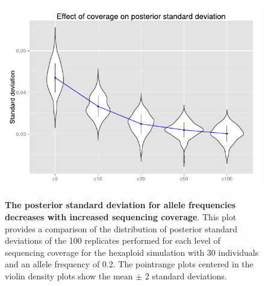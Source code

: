 \documentclass[11pt,english,letterpaper,oneside]{article}
\begin{document}
\begin{figure}
\centering
\caption{\textbf{The posterior standard deviation for allele frequencies decreases with increased sequencing coverage}. This plot provides a comparison of the distribution of posterior standard deviations of the 100 replicates performed for each level of sequencing coverage for the hexaploid simulation with 30 individuals and an allele frequency of 0.2. The pointrange plots centered in the violin density plots show the mean $\pm$ 2 standard deviations.}
\vspace{0.25in}
\includegraphics{fig/figure4-coverage-sd}
\label{fig:coverage-sd}
\end{figure}
\end{document}
